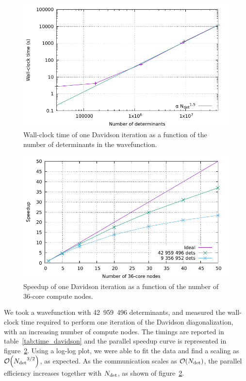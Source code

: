 \documentclass[./thesis.tex]{subfiles}
\begin{document}
\begin{figure}[h]
    \begin{center}
      \includegraphics[width=0.8\columnwidth]{figures/perf/scaling_davidson_ndet}
      \caption{Wall-clock time of one Davidson iteration as a function of the number of
determinants in the wavefunction.}
      \label{fig:speedup_davidson_ndet}
    \end{center}
\end{figure}

\begin{figure}[h]
    \begin{center}
      \includegraphics[width=0.8\columnwidth]{figures/perf/scaling_davidson}
      \caption{Speedup of one Davidson iteration as a function of the number of
36-core compute nodes.}
      \label{fig:speedup_davidson}
    \end{center}
\end{figure}

We took a wavefunction with 42~959~496 determinants, and measured the wall-clock time required to
perform one iteration of the Davidson diagonalization, with an increasing number of compute nodes.
The timings are reported in table~\ref{tab:time_davidson} and the parallel speedup curve is represented in figure~\ref{fig:speedup_davidson}. Using a log-log plot, we were able to fit the data and find
a scaling as $\order{\Ndet^{3/2}}$, as expected.  As the communication scales as $\order{\Ndet}$, 
the parallel efficiency increases together with ${N_\text{det}}$, as shown of figure~\ref{fig:speedup_davidson}.
\end{document}
